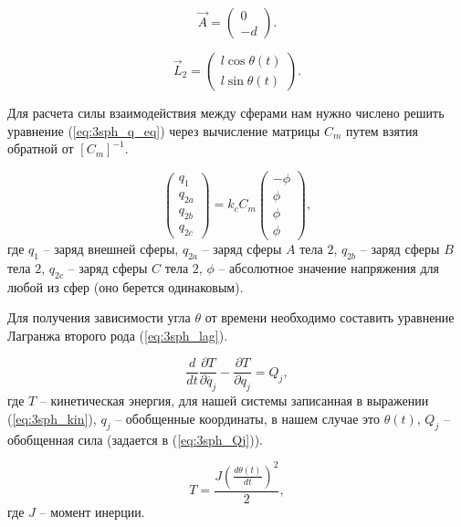\begin{equation}
\label{eq:3sph_A}
	\vec{A} =
	\begin{pmatrix}
		0\\
		-d
	\end{pmatrix}.
\end{equation}

\begin{equation}
\label{eq:3sph_l2}
	\vec{L}_2 = 
	\begin{pmatrix}
		l \cos \theta(t)\\
		l \sin \theta(t)
	\end{pmatrix}.
\end{equation}

Для расчета силы взаимодействия между сферами нам нужно числено решить уравнение (\ref{eq:3sph_q_eq}) через вычисление матрицы $C_m$ путем взятия обратной от $[C_m]^{-1}$.

\begin{equation}
\label{eq:3sph_q_eq}
	\begin{pmatrix}
		q_1\\
		q_{2a}\\
		q_{2b}\\
		q_{2c}
	\end{pmatrix}
	= k_c C_m 
	\begin{pmatrix}
		-\phi\\
		\phi\\
		\phi\\
		\phi
	\end{pmatrix},
\end{equation}
где $q_1$ – заряд внешней сферы, $q_{2a}$ – заряд сферы $A$ тела $2$, $q_{2b}$ – заряд сферы $B$ тела $2$, $q_{2c}$ – заряд сферы $C$ тела $2$, $\phi$ – абсолютное значение напряжения для любой из сфер (оно берется одинаковым). 

Для получения зависимости угла $\theta$ от времени необходимо составить уравнение Лагранжа второго рода (\ref{eq:3sph_lag}).

\begin{equation}
\label{eq:3sph_lag}
	\frac{d}{dt}\frac{\partial T}{\partial \dot{q_j}} - \frac{\partial T}{\partial q_j} = Q_j,
\end{equation}
где $T$ – кинетическая энергия, для нашей системы записанная в выражении (\ref{eq:3sph_kin}), $q_j$ – обобщенные координаты, в нашем случае это $\theta(t)$, $Q_j$ – обобщенная сила (задается в (\ref{eq:3sph_Qj})).

\begin{equation}
\label{eq:3sph_kin}
	T = \frac{J \left(\frac{d \theta (t)}{dt}\right)^2}{2},
\end{equation}
где $J$ – момент инерции.

